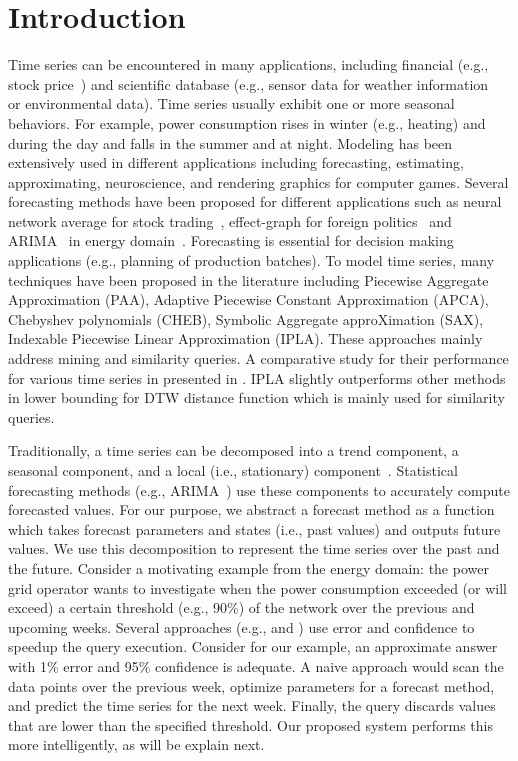 \documentclass[10pt,conference,letterpaper]{IEEEtran}
\begin{document}
\section{Introduction}
  \label{sec:intro}
Time series can be encountered in many applications, including financial (e.g., stock price~\cite{stock}) and scientific database (e.g.,
sensor data for weather information~\cite{arimaEng} or environmental data).
Time series usually exhibit one or more seasonal behaviors. For example, power consumption rises in winter (e.g., heating) and during the day and falls in the summer and at night. Modeling has been extensively used in different applications including forecasting, estimating, approximating, neuroscience, and rendering graphics for computer games.  Several  forecasting methods have been proposed for different applications such as neural network  average for stock trading~\cite{stock},  effect-graph for foreign politics~\cite{iran} and ARIMA~\cite{tBOX76a} in energy domain~\cite{arimaEng}.  Forecasting is essential for  decision making applications (e.g., planning of production batches). To model time series, many techniques have been proposed in the literature including Piecewise Aggregate Approximation (PAA), Adaptive Piecewise Constant Approximation (APCA), Chebyshev polynomials (CHEB), Symbolic Aggregate approXimation (SAX), Indexable Piecewise Linear Approximation (IPLA).  These approaches mainly address mining and similarity  queries.  A comparative study for their performance for various time series in presented in \cite{DTPE08}. IPLA slightly outperforms other methods in lower bounding for DTW distance function which is mainly used for similarity queries.

Traditionally, a time series  can be decomposed into a trend component, a seasonal component, and a local (i.e., stationary) component~\cite{Decompose}. 
Statistical  forecasting methods (e.g., ARIMA~\cite{tBOX76a}) use these components  to accurately compute forecasted values. For our purpose, we abstract a forecast method as a function which takes forecast parameters and states (i.e., past values) and outputs future values. We use this decomposition to represent the time series over the past and the future.
Consider a motivating example from the energy domain: the power grid operator wants to investigate when the power consumption exceeded (or will exceed) a certain threshold (e.g., 90\%) of the network  over the previous and upcoming weeks. Several approaches (e.g.,\cite{AG99} and \cite{KML10}) use error and confidence to speedup the query execution. Consider for our example, an approximate answer with 1\% error  and 95\% confidence is adequate. A naive approach would scan the data points over the previous week, optimize parameters for a forecast method, and predict the time series for the next week. Finally, the query discards values that are lower than the specified threshold. Our proposed system performs this more intelligently, as will be explain next. 
\end{document}
